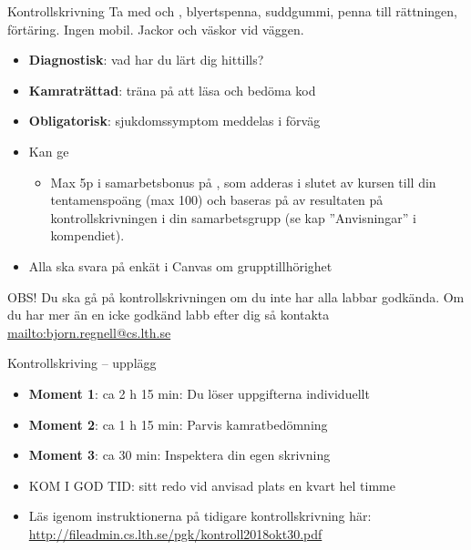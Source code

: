 


\begin{Slide}{Kontrollskrivning}\SlideFontSmall
Ta med  och , blyertspenna, suddgummi,  penna till rättningen, förtäring. Ingen mobil. Jackor och väskor vid väggen.
\begin{itemize}
  \item \textbf{Diagnostisk}: vad har du lärt dig hittills?
  \item \textbf{Kamraträttad}: träna på att läsa och bedöma kod
  \item \textbf{Obligatorisk}: sjukdomssymptom  meddelas i förväg
  \item Kan ge  
  \begin{itemize}\SlideFontTiny
    \item[] Max 5p i samarbetsbonus på , som adderas i slutet av kursen till din tentamenspoäng (max 100) och baseras på  av resultaten på kontrollskrivningen i din samarbetsgrupp (se kap ''Anvisningar'' i kompendiet).
  \end{itemize}
  \ifkompendium\else
  \item Alla ska svara på enkät i Canvas om grupptillhörighet
  \fi
\end{itemize}
OBS! Du ska gå på kontrollskrivningen  om du inte har alla labbar godkända. Om du har mer än en icke godkänd labb efter dig så kontakta \url{mailto:bjorn.regnell@cs.lth.se}
\end{Slide}

\begin{Slide}{Kontrollskriving -- upplägg}\SlideFontSmall
\begin{itemize}
\item \textbf{Moment 1}: ca 2 h 15 min: Du löser uppgifterna individuellt
\item \textbf{Moment 2}: ca 1 h 15 min: Parvis kamratbedömning
\item \textbf{Moment 3}: ca 30 min: Inspektera din egen skrivning
\item KOM I GOD TID: sitt redo vid anvisad plats en kvart  hel timme
\item Läs  igenom instruktionerna på tidigare kontrollskrivning här: 
\url{http://fileadmin.cs.lth.se/pgk/kontroll2018okt30.pdf}

\end{itemize}


\end{Slide}

